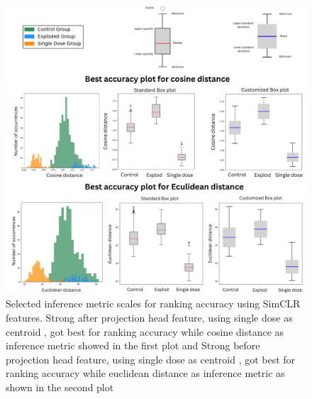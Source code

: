 \begin{figure}[H]
  \centering
  \includegraphics[scale=0.5]{figures/allbox.pdf} 
  \caption{Selected inference metric scales for ranking accuracy using SimCLR features. Strong after projection head feature, using single dose as centroid , got best for ranking accuracy while cosine distance as inference metric showed in the first plot and Strong before  projection head feature, using single dose as centroid , got best for ranking accuracy while euclidean distance as inference metric as shown in the second plot}
  \label{fig:cosi_mean}
\end{figure}



